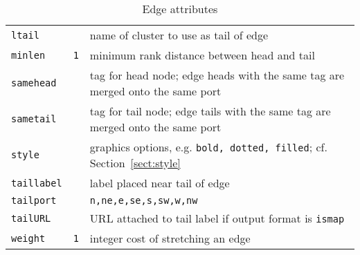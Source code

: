 \documentclass[11pt]{article}
\begin{document}
\begin{table}[p]
\begin{tabular}[t]{|l|l|p{3.5in}|}
{\tt ltail} & & name of cluster to use as tail of edge \\
{\tt minlen} & {\tt 1} & minimum rank distance between head and tail \\
{\tt samehead} & & tag for head node; edge heads with the same tag are merged onto
the same port \\
{\tt sametail} & & tag for tail node; edge tails with the same tag are merged onto
the same port \\
{\tt style} & & graphics options, e.g. {\tt bold, dotted, filled}; cf.
Section~\ref{sect:style} \\ 
{\tt taillabel} & & label placed near tail of edge \\
{\tt tailport} & & {\tt n,ne,e,se,s,sw,w,nw}\\
{\tt tailURL} & & URL attached to tail label if output format is {\tt ismap} \\
{\tt weight} & {\tt 1} & integer cost of stretching an edge \\
\hline
\end{tabular}
\caption{Edge attributes}
\label{tab:eattr}
\end{table}
\end{document}
